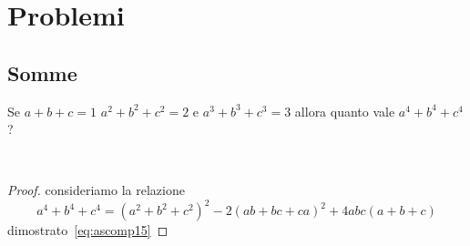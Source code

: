 \chapter{Problemi}
\section{Somme}
\begin{prob}
Se $a+b+c=1$ $a^2+b^2+c^2=2$ e $a^3+b^3+c^3=3$ allora quanto vale $a^4+b^4+c^4$?
\end{prob}~\cite{Gregorio2021}
\begin{proof}
consideriamo la relazione \[a^4+b^4+c^4=(a^2+b^2+c^2)^2-2(ab+bc+ca)^2+4abc(a+b+c)\] dimostrato~\cref{eq:ascomp15}
\end{proof}